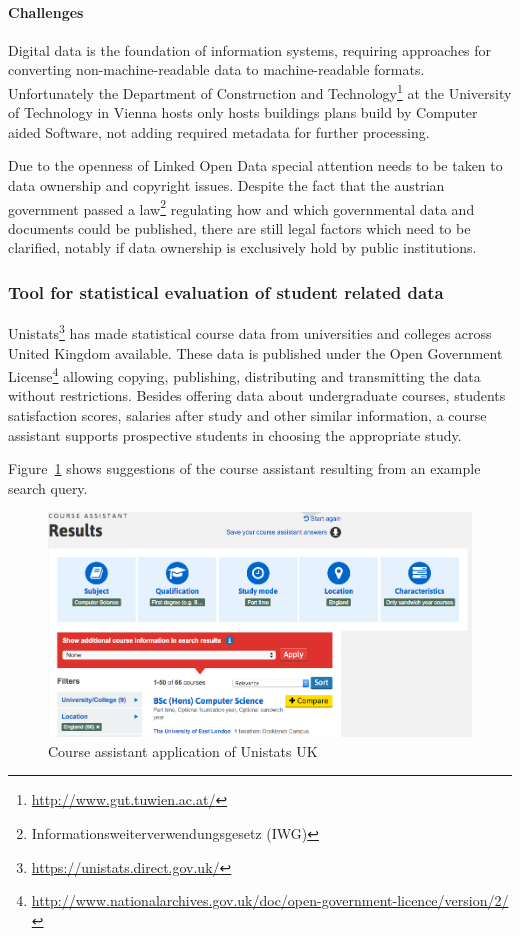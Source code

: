 \documentclass{article}
\begin{document}
\paragraph{Challenges}
Digital data is the foundation of information systems, requiring approaches for converting non-machine-readable data to machine-readable formats. Unfortunately the Department of Construction and Technology\footnote{\url{http://www.gut.tuwien.ac.at/}} at the University of Technology in Vienna hosts only hosts buildings plans build by Computer aided Software, not adding required metadata for further processing. 

Due to the openness of Linked Open Data special attention needs to be taken to data ownership and copyright issues. Despite the fact that the austrian government passed a law\footnote{Informationsweiterverwendungsgesetz (IWG)} regulating how and which governmental data and documents could be published, there are still legal factors which need to be clarified, notably if data ownership is exclusively hold by public institutions. 
\subsubsection{Tool for statistical evaluation of student related data}
Unistats\footnote{\url{https://unistats.direct.gov.uk/}} has made statistical course data from universities and colleges across United Kingdom available. These data is published under the Open Government License\footnote{\url{http://www.nationalarchives.gov.uk/doc/open-government-licence/version/2/}} allowing copying, publishing, distributing and transmitting the data without restrictions. Besides offering data about undergraduate courses, students satisfaction scores, salaries after study and other similar information, a course assistant supports prospective students in choosing the appropriate study. 

Figure~\ref{fig:unistats-uk} shows suggestions of the course assistant resulting from an example search query. 
\begin{figure}[H]
	\centering \includegraphics*[width=.8\columnwidth]{unistats_uk.png}
	\caption{Course assistant application of Unistats UK}
	\label{fig:unistats-uk}
\end{figure}
\end{document}
